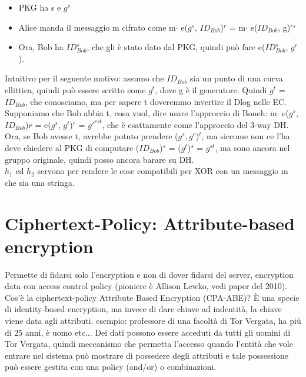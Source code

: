 \documentclass[16px]{article}
\begin{document}
\begin{itemize}
\item PKG ha s e $g^s$
\item Alice manda il messaggio m cifrato come m$\cdot$ e($g^s$, $ID_{Bob}$)$^r$ = m$\cdot$ e($ID_{Bob}$, g)$^{rs}$
\item Ora, Bob ha $ID_{Bob}^s$, che gli è stato dato dal PKG, quindi può fare e($ID_{Bob}^s$, $g^r$).
\end{itemize}
Intuitivo per il seguente motivo: assumo che $ID_{Bob}$ sia un punto di una curva ellittica, quindi può essere scritto come $g^t$, dove g è il generatore. Quindi $g^t$ = $ID_{Bob}$, che conosciamo, ma per sapere t doveremmo invertire il Dlog nelle EC. Supponiamo che Bob abbia t, cosa vuol, dire usare l'approccio di Boneh: m$\cdot$ e($g^s$, $ID_{Bob}$)$r$ = e($g^s$, $g^t$)$^r$ = $g'^{rst}$, che è esattamente come l'approccio del 3-way DH. Ora, se Bob avesse t, avrebbe potuto prendere ($g^s, g^r$)$^t$, ma siccome non ce l'ha deve chiedere al PKG di computare ($ID_{Bob}$)$^s$ = ($g^t$)$^s$ = $g^{st}$, ma sono ancora nel gruppo originale, quindi posso ancora barare su DH.\\ $h_1$ ed $h_2$ servono per rendere le cose compatibili per XOR con un messaggio m che sia una stringa.
\section{Ciphertext-Policy: Attribute-based encryption}
Permette di fidarsi solo l'encryption e non di dover fidarsi del server, encryption data con access control policy (pioniere è Allison Lewko, vedi paper del 2010).
Cos'è la ciphertext-policy Attribute Based Encryption (CPA-ABE)? È una specie di identity-based encryption, ma invece di dare chiave ad indentità, la chiave viene data agli attributi. esempio: professore di una facoltà di Tor Vergata, ha più di 25 anni, è uomo etc... Dei dati possono essere acceduti da tutti gli uomini di Tor Vergata, quindi meccanismo che permetta l'accesso quando l'entità che vole entrare nel sistema può mostrare di possedere degli attributi e tale possessione può essere gestita con una policy (and/or) o combinazioni.
\end{document}

